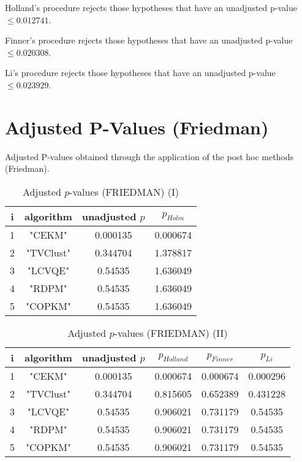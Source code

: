 \documentclass[a4paper,10pt]{article}
\begin{document}
Holland's procedure rejects those hypotheses that have an unadjusted p-value $\le0.012741$.

Finner's procedure rejects those hypotheses that have an unadjusted p-value $\le0.020308$.

Li's procedure rejects those hypotheses that have an unadjusted p-value $\le0.023929$.


\newpage

\section{Adjusted P-Values (Friedman)}


Adjusted P-values obtained through the application of the post hoc methods (Friedman).

\begin{table}[!htp]
\centering\small
\begin{tabular}{cccc}
i&algorithm&unadjusted $p$&$p_{Holm}$\\
\hline1&"CEKM"&0.000135&0.000674\\2&"TVClust"&0.344704&1.378817\\3&"LCVQE"&0.54535&1.636049\\4&"RDPM"&0.54535&1.636049\\5&"COPKM"&0.54535&1.636049\\\hline
\end{tabular}
\caption{Adjusted $p$-values (FRIEDMAN) (I)}
\end{table}
\begin{table}[!htp]
\centering\small
\begin{tabular}{cccccc}
i&algorithm&unadjusted $p$&$p_{Holland}$&$p_{Finner}$&$p_{Li}$\\
\hline1&"CEKM"&0.000135&0.000674&0.000674&0.000296\\2&"TVClust"&0.344704&0.815605&0.652389&0.431228\\3&"LCVQE"&0.54535&0.906021&0.731179&0.54535\\4&"RDPM"&0.54535&0.906021&0.731179&0.54535\\5&"COPKM"&0.54535&0.906021&0.731179&0.54535\\\hline
\end{tabular}
\caption{Adjusted $p$-values (FRIEDMAN) (II)}
\end{table}

\newpage
\end{document}
